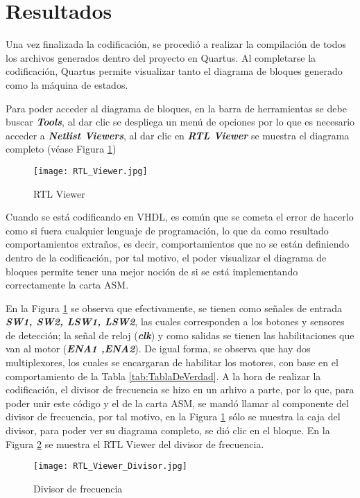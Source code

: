 \documentclass{article}
\begin{document}
\section{Resultados}
Una vez finalizada la codificación, se procedió a realizar la compilación de todos los archivos generados dentro del proyecto en Quartus. Al completarse la codificación, Quartus permite visualizar tanto el diagrama de bloques generado como la máquina de estados. 

Para poder acceder al diagrama de bloques, en la barra de herramientas se debe buscar \textbf{\textit{Tools}}, al dar clic se despliega un menú de opciones por lo que es necesario acceder a \textbf{\textit{Netlist Viewers}}, al dar clic en \textbf{\textit{RTL Viewer}} se muestra el diagrama completo (véase Figura \ref{fig:RTL_Viewer})
\begin{figure}[h!]
    \centering
    \texttt{[image: RTL\_Viewer.jpg]}
    \caption{\label{fig:RTL_Viewer}RTL Viewer}
\end{figure}

Cuando se está codificando en VHDL, es común que se cometa el error de hacerlo como si fuera cualquier lenguaje de programación, lo que da como resultado comportamientos extraños, es decir, comportamientos que no se están definiendo dentro de la codificación, por tal motivo, el poder visualizar el diagrama de bloques permite tener una mejor noción de si se está implementando correctamente la carta ASM.

En la Figura \ref{fig:RTL_Viewer} se observa que efectivamente, se tienen como señales de entrada \textbf{\textit{SW1, SW2, LSW1, LSW2}}, las cuales corresponden a los botones y sensores de detección; la señal de reloj (\textbf{\textit{clk}}) y como salidas se tienen las habilitaciones que van al motor (\textbf{\textit{ENA1 ,ENA2}}). De igual forma, se observa que hay dos multiplexores, los cuales se encargaran de habilitar los motores, con base en el comportamiento de la Tabla \ref{tab:TablaDeVerdad}. A la hora de realizar la codificación, el divisor de frecuencia se hizo en un arhivo a parte, por lo que, para poder unir este código y el de la carta ASM, se mandó llamar al componente del divisor de frecuencia, por tal motivo, en la Figura \ref{fig:RTL_Viewer} sólo se muestra la caja del divisor, para poder ver su diagrama completo, se dió clic en el bloque. En la Figura \ref{fig:RTL_Viewer_Divisor} se muestra el RTL Viewer del divisor de frecuencia.
\begin{figure}[h]
    \centering
    \texttt{[image: RTL\_Viewer\_Divisor.jpg]}
    \caption{\label{fig:RTL_Viewer_Divisor}Divisor de frecuencia}
\end{figure}
\end{document}
